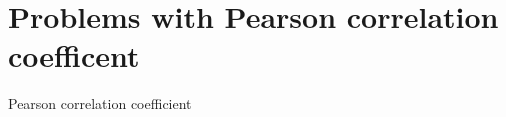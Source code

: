 \chapter{Problems with Pearson correlation coefficent}
\begin{definition}
	Pearson correlation coefficient
\end{definition}
